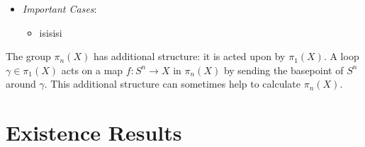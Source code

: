 \documentclass{amsart}
\begin{document}
\begin{enumerate}[(I)]
\begin{itemize}
			\item \textit{Important Cases}:
			\begin{itemize}
				\item isisisi
			\end{itemize}
		\end{itemize}
	\end{enumerate}
	
	The group $\pi_n(X)$ has additional structure: it is acted upon by $\pi_1(X)$. A loop $\gamma \in \pi_1(X)$ acts on a map $f:S^n\to X$ in $\pi_n(X)$ by sending the basepoint of $S^n$ around $\gamma$. This additional structure can sometimes help to calculate $\pi_n(X)$.
	
	\newpage
	\section{Existence Results}
	
\end{document}
